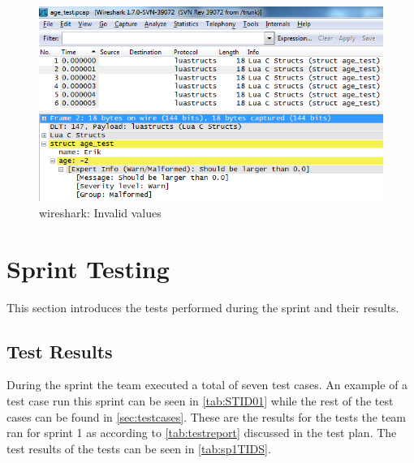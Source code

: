 \begin{figure}[htb]
	\center
	\includegraphics[width=\textwidth]{./sprints/img/wireshark_outofrange}
	\caption{\Gls{wireshark}: Invalid values\label{fig:sp1rangerule}}
\end{figure}


\section{Sprint Testing}
\label{sec:sp1:test}
This section introduces the tests performed during the sprint and their
results.

\subsection{Test Results}
During the sprint the team executed a total of seven test cases. An example of a test case run this sprint can be seen in \autoref{tab:STID01} while the rest of the test cases can be found in \autoref{sec:testcases}. These are the results for the tests the team ran for sprint 1 as according to \autoref{tab:testreport} discussed in the test plan.
The test results of the tests can be seen in \autoref{tab:sp1TIDS}.

